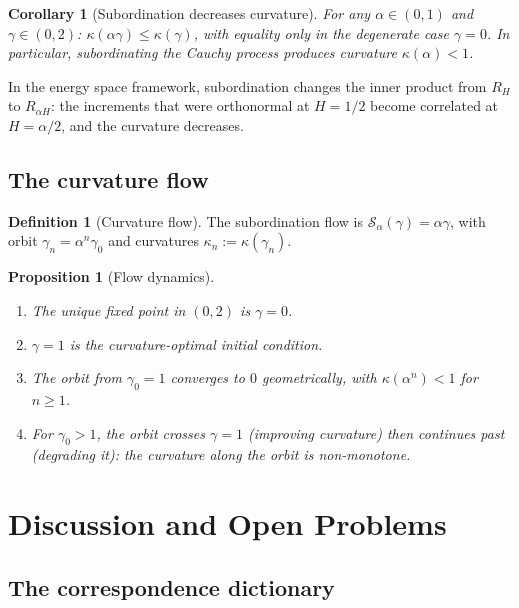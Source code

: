 \documentclass[11pt,a4paper]{article}
\theoremstyle{plain}
\newtheorem{proposition}[theorem]{Proposition}
\newtheorem{corollary}[theorem]{Corollary}
\theoremstyle{definition}
\newtheorem{definition}[theorem]{Definition}
\theoremstyle{remark}
\begin{document}
\begin{corollary}[Subordination decreases curvature]
\label{cor:sub}
For any $\alpha \in (0,1)$ and $\gamma \in (0,2)$:
$\kappa(\alpha\gamma) \leq \kappa(\gamma)$,
with equality only in the degenerate case $\gamma = 0$.
In particular, subordinating the Cauchy process
produces curvature $\kappa(\alpha) < 1$.
\end{corollary}

In the energy space framework, subordination changes
the inner product from $R_H$ to $R_{\alpha H}$:
the increments that were orthonormal at $H = 1/2$
become correlated at $H = \alpha/2$, and the curvature
decreases.


\subsection{The curvature flow}

\begin{definition}[Curvature flow]\label{def:flow}
The subordination flow is
$\mathcal{S}_\alpha(\gamma) = \alpha\gamma$,
with orbit $\gamma_n = \alpha^n\gamma_0$ and
curvatures $\kappa_n := \kappa(\gamma_n)$.
\end{definition}

\begin{proposition}[Flow dynamics]\label{prop:flow}
\begin{enumerate}[label=\textup{(\roman*)}]
\item The unique fixed point in $(0,2)$ is $\gamma = 0$.
\item $\gamma = 1$ is the curvature-optimal initial condition.
\item The orbit from $\gamma_0 = 1$ converges to $0$
  geometrically, with $\kappa(\alpha^n) < 1$ for $n \geq 1$.
\item For $\gamma_0 > 1$, the orbit crosses $\gamma = 1$
  (improving curvature) then continues past
  (degrading it): the curvature along the orbit is
  non-monotone.
\end{enumerate}
\end{proposition}


\section{Discussion and Open Problems}\label{sec:discussion}

\subsection{The correspondence dictionary}
\end{document}

